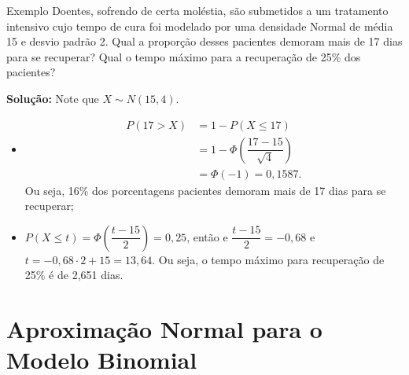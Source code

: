 \documentclass[9pt]{beamer}
\begin{document}
\begin{frame}{Exemplo}
 Doentes, sofrendo de certa moléstia, são submetidos a um tratamento intensivo cujo tempo de cura foi modelado por uma densidade Normal de média 15 e desvio padrão 2. Qual a proporção desses pacientes
 demoram mais de 17 dias para se recuperar? Qual o tempo máximo para a recuperação de 25\% dos pacientes?
 
 \textbf{Solução:}
 Note que $X \sim N(15, 4)$.
 \begin{itemize}
  \item 
  \begin{align*}
  P(17 > X) &= 1 -  P(X \leq 17)\\
   &= 1 - \Phi\left( \dfrac{17-15}{\sqrt{4}} \right)\\
   &=\Phi(-1) = 0,1587.
  \end{align*}
  Ou seja, 16\% dos porcentagens pacientes demoram mais de 17 dias para se recuperar;
  \item $P(X \leq t) = \Phi\left( \dfrac{t-15}{2} \right) = 0,25$, então e $\dfrac{t-15}{2} = -0,68$ e $t = -0,68 \cdot 2 + 15 = 13,64$. Ou seja, o tempo máximo para recuperação de 25\% é de 2,651 dias.
 \end{itemize}
\end{frame}

\section{Aproximação Normal para o Modelo Binomial}
\end{document}
